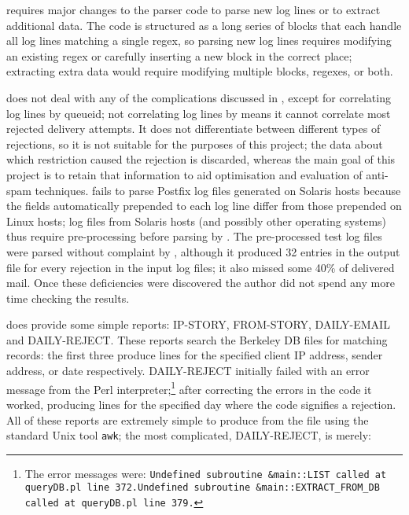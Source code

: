  requires major changes to the parser code to parse new log lines
or to extract additional data.  The code is structured as a long series of
blocks that each handle all log lines matching a single regex, so parsing
new log lines requires modifying an existing regex or carefully inserting a
new block in the correct place; extracting extra data would require
modifying multiple blocks, regexes, or both.

 does not deal with any of the complications discussed in
, except for correlating log lines by queueid;
not correlating log lines by  means it cannot correlate most
rejected delivery attempts.  It does not differentiate between different
types of rejections, so it is not suitable for the purposes of this
project; the data about which restriction caused the rejection is
discarded, whereas the main goal of this project is to retain that
information to aid optimisation and evaluation of anti-spam techniques.
 fails to parse Postfix log files generated on Solaris hosts
because the fields automatically prepended to each log line differ from
those prepended on Linux hosts; log files from Solaris hosts (and possibly
other operating systems) thus require pre-processing before parsing by
.  The \numberOFlogFILES{} pre-processed test log files were
parsed without complaint by , although it produced 32 entries
in the output  file for every rejection in the input log
files; it also missed some 40\% of delivered mail.  Once these deficiencies
were discovered the author did not spend any more time checking the
results.

 does provide some simple reports: IP-STORY, FROM-STORY,
DAILY-EMAIL and DAILY-REJECT\@.  These reports search the Berkeley DB files
for matching records: the first three produce  lines for the
specified client IP address, sender address, or date respectively.
DAILY-REJECT initially failed with an error message from the Perl
interpreter;\footnote{The error messages were: \newline{}\texttt{Undefined
subroutine \&main::LIST called at queryDB.pl line
372.}\newline{}\texttt{Undefined subroutine \&main::EXTRACT\_FROM\_DB
called at queryDB.pl line 379.}} after correcting the errors in the code it
worked, producing  lines for the specified day where the
 code signifies a rejection.  All of these reports are
extremely simple to produce from the  file using the standard
Unix tool \texttt{awk}; the most complicated, DAILY-REJECT, is
merely:

